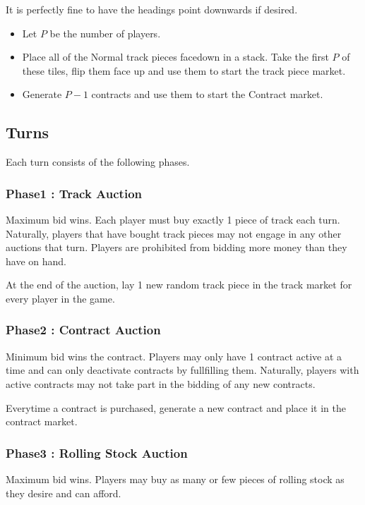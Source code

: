\documentclass[12pt, letterpaper]{article}
\begin{document}
It is perfectly fine to have the headings point downwards if desired.
\begin{itemize}
\item Let $P$ be the number of players.
\item Place all of the Normal track pieces facedown in a stack. Take the first $P$ of these tiles, flip them face up and use them to start the track piece market.
\item Generate $P-1$ contracts and use them to start the Contract market.
\end{itemize}

\subsection{Turns}

Each turn consists of the following phases.

\subsubsection{Phase1 : Track Auction}

Maximum bid wins. Each player must buy exactly 1 piece of track each turn. Naturally, players that have bought track pieces may not engage in any other auctions that turn. Players are prohibited from bidding more money than they have on hand.

At the end of the auction, lay 1 new random track piece in the track market for every player in the game.

\subsubsection{Phase2 : Contract Auction}

Minimum bid wins the contract. Players may only have 1 contract active at a time and can only deactivate contracts by fullfilling them.
Naturally, players with active contracts may not take part in the bidding of any new contracts.

Everytime a contract is purchased, generate a new contract and place it in the contract market.

\subsubsection{Phase3 : Rolling Stock Auction}

Maximum bid wins. Players may buy as many or few pieces of rolling stock as they desire and can afford.
\end{document}
